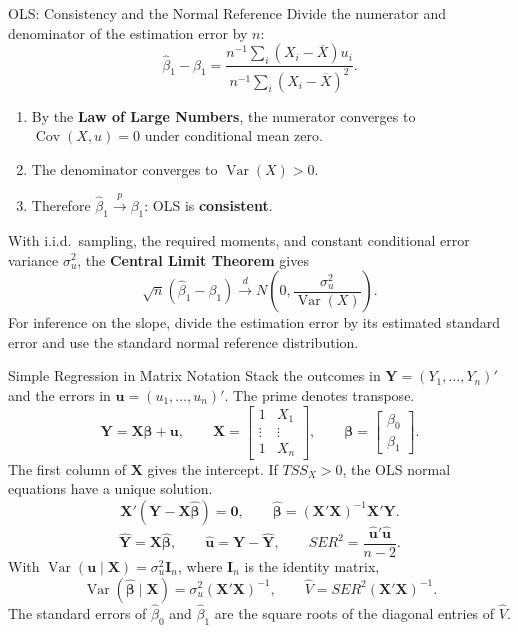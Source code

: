\documentclass[10pt,aspectratio=169]{beamer}
\newcommand{\Var}{\operatorname{Var}}
\newcommand{\Cov}{\operatorname{Cov}}
\begin{document}
\begin{frame}{OLS: Consistency and the Normal Reference}
\small
Divide the numerator and denominator of the estimation error by $n$:
\[
\widehat\beta_1-\beta_1
=\frac{n^{-1}\sum_i(X_i-\overline X)u_i}
       {n^{-1}\sum_i(X_i-\overline X)^2}.
\]
\begin{enumerate}
\item By the \textbf{Law of Large Numbers}, the numerator converges to $\Cov(X,u)=0$ under conditional mean zero.
\item The denominator converges to $\Var(X)>0$.
\item Therefore $\widehat\beta_1\xrightarrow{p}\beta_1$: OLS is \textbf{consistent}.
\end{enumerate}
With i.i.d.\ sampling, the required moments, and constant conditional error variance $\sigma_u^2$, the \textbf{Central Limit Theorem} gives
\[
\sqrt n(\widehat\beta_1-\beta_1)
\xrightarrow{d}N\!\left(0,\frac{\sigma_u^2}{\Var(X)}\right).
\]
For inference on the slope, divide the estimation error by its estimated standard error and use the standard normal reference distribution.
\end{frame}

\begin{frame}{Simple Regression in Matrix Notation}
\small
Stack the outcomes in $\mathbf Y=(Y_1,\ldots,Y_n)'$ and the errors in $\mathbf u=(u_1,\ldots,u_n)'$. The prime denotes transpose.
\[
\mathbf Y=\mathbf X\boldsymbol{\beta}+\mathbf u,\qquad
\mathbf X=\begin{bmatrix}1&X_1\\ \vdots&\vdots\\ 1&X_n\end{bmatrix},\qquad
\boldsymbol{\beta}=\begin{bmatrix}\beta_0\\ \beta_1\end{bmatrix}.
\]
The first column of $\mathbf X$ gives the intercept. If $TSS_X>0$, the OLS normal equations have a unique solution.
\[
\mathbf X'(\mathbf Y-\mathbf X\widehat{\boldsymbol{\beta}})=\mathbf 0,
\qquad
\boxed{\widehat{\boldsymbol{\beta}}=(\mathbf X'\mathbf X)^{-1}\mathbf X'\mathbf Y}.
\]
\[
\widehat{\mathbf Y}=\mathbf X\widehat{\boldsymbol{\beta}},
\qquad
\widehat{\mathbf u}=\mathbf Y-\widehat{\mathbf Y},
\qquad
SER^2=\frac{\widehat{\mathbf u}'\widehat{\mathbf u}}{n-2}.
\]
With $\Var(\mathbf u\mid\mathbf X)=\sigma_u^2\mathbf I_n$, where $\mathbf I_n$ is the identity matrix,
\[
\Var(\widehat{\boldsymbol{\beta}}\mid\mathbf X)=\sigma_u^2(\mathbf X'\mathbf X)^{-1},
\qquad
\widehat V=SER^2(\mathbf X'\mathbf X)^{-1}.
\]
The standard errors of $\widehat\beta_0$ and $\widehat\beta_1$ are the square roots of the diagonal entries of $\widehat V$.
\end{frame}
\end{document}
